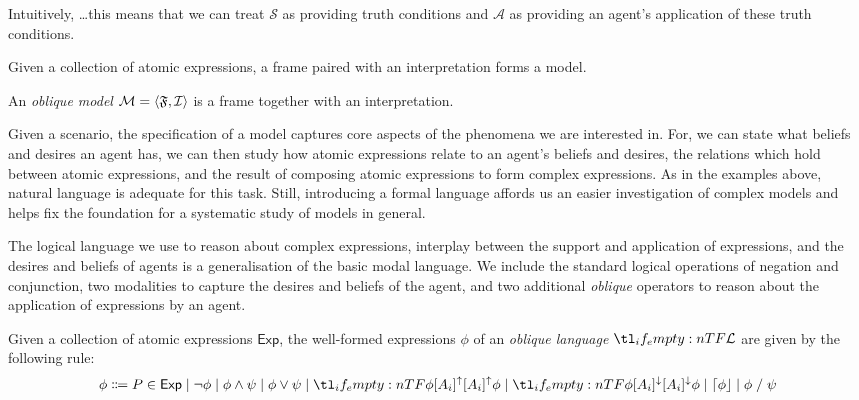 \documentclass[10pt]{article}
\begin{document}
{\color{red} Intuitively, \dots this means that we can treat \(\mathcal{S}\) as providing truth conditions and \(\mathcal{A}\) as providing an agent's application of these truth conditions.}

Given a collection of atomic expressions, a frame paired with an interpretation forms a model.

\begin{definition}[Model]
  An \emph{oblique model} \(\mathcal{M} = \langle \mathfrak{F}, \mathcal{I}  \rangle\) is a frame together with an interpretation.
\end{definition}

Given a scenario, the specification of a model captures core aspects of the phenomena we are interested in.
For, we can state what beliefs and desires an agent has, we can then study how atomic expressions relate to an agent's beliefs and desires, the relations which hold between atomic expressions, and the result of composing atomic expressions to form complex expressions.
As in the examples above, natural language is adequate for this task.
Still, introducing a formal language affords us an easier investigation of complex models and helps fix the foundation for a systematic study of models in general.

The logical language we use to reason about complex expressions, interplay between the support and application of expressions, and the desires and beliefs of agents is a generalisation of the basic modal language.
We include the standard logical operations of negation and conjunction, two modalities to capture the desires and beliefs of the agent, and two additional \emph{oblique} operators to reason about the application of expressions by an agent.

\begin{definition}
  Given a collection of atomic expressions \(\mathsf{Exp}\), the well-formed expressions \(\phi\) of an \emph{oblique language} \(\olang{}\) are given by the following rule:
  \[
    \phi \Coloneqq P \in \mathsf{Exp} \bnfsep \lnot\phi \bnfsep \phi\land\psi \bnfsep \phi\lor\psi \bnfsep \lattu[A_{i}]{\phi} \bnfsep \lattd[A_{i}]{\phi} \bnfsep \attn{\phi} \bnfsep \phi \ltrans \psi
  \]
\end{definition}
\end{document}
